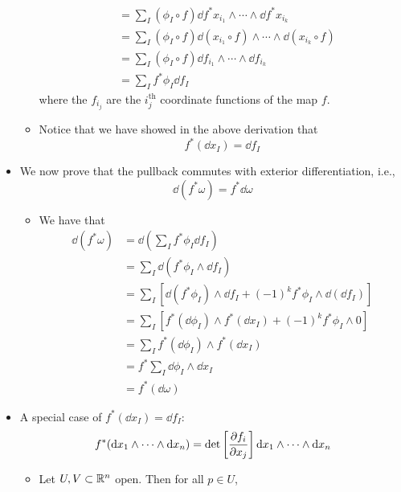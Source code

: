 \documentclass[../notes.tex]{subfiles}
\begin{document}
\begin{itemize}
\begin{itemize}
\begin{align*}
            &= \sum_I(\phi_I\circ f)\dd{f^*x_{i_1}}\wedge\cdots\wedge\dd{f^*x_{i_k}}\tag{2}\\
            &= \sum_I(\phi_I\circ f)\dd(x_{i_1}\circ f)\wedge\cdots\wedge\dd(x_{i_k}\circ f)\tag{2}\\
            &= \sum_I(\phi_I\circ f)\dd f_{i_1}\wedge\cdots\wedge\dd f_{i_k}\\
            &= \sum_If^*\phi_I\dd f_I
        \end{align*}
        where the $f_{i_j}$ are the $i_j^\text{th}$ coordinate functions of the map $f$.
        \item Notice that we have showed in the above derivation that
        \begin{equation*}
            f^*(\dd x_I) = \dd f_I
        \end{equation*}
    \end{itemize}
    \item We now prove that the pullback commutes with exterior differentiation, i.e.,
    \begin{equation*}
        \dd(f^*\omega) = f^*\dd\omega
    \end{equation*}
    \begin{itemize}
        \item We have that
        \begin{align*}
            \dd(f^*\omega) &= \dd(\sum_If^*\phi_I\dd f_I)\\
            &= \sum_I\dd(f^*\phi_I\wedge\dd f_I)\\
            &= \sum_I\left[ \dd(f^*\phi_I)\wedge\dd f_I+(-1)^kf^*\phi_I\wedge\dd(\dd f_I) \right]\\
            &= \sum_I\left[ f^*(\dd\phi_I)\wedge f^*(\dd{x_I})+(-1)^kf^*\phi_I\wedge 0 \right]\\
            &= \sum_If^*(\dd\phi_I)\wedge f^*(\dd{x_I})\\
            &= f^*\sum_I\dd\phi_I\wedge\dd{x_I}\\
            &= f^*(\dd\omega)
        \end{align*}
    \end{itemize}
    \item A special case of $f^*(\dd x_I)=\dd f_I$:
    \begin{equation*}
        f^*(\dd x_1\wedge\cdots\wedge\dd x_n) = \det\left[ \pdv{f_i}{x_j} \right]\dd x_1\wedge\cdots\wedge\dd x_n
    \end{equation*}
    \begin{itemize}
        \item Let $U,V\subset\mathbb{R}^n$ open. Then for all $p\in U$,

\end{itemize}
\end{itemize}
\end{document}
